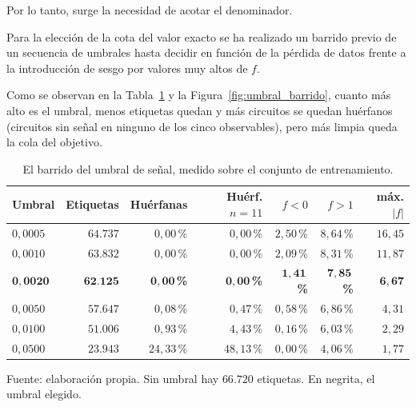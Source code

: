 Por lo tanto, surge la necesidad de acotar el denominador.

Para la elección de la cota del valor exacto se ha realizado un barrido previo de un secuencia de umbrales hasta decidir en función de la pérdida de datos frente a la introducción de sesgo por valores muy altos de $f$.

Como se observan en la Tabla~\ref{tab:barrido} y la Figura~\ref{fig:umbral_barrido}, cuanto más alto es el umbral, menos etiquetas quedan y más circuitos se quedan huérfanos (circuitos sin señal en ninguno de los cinco observables), pero más limpia queda la cola del objetivo.

\begin{table}[htbp]
    \centering
    \caption{El barrido del umbral de señal, medido sobre el conjunto de entrenamiento.}
    \label{tab:barrido}
    {\footnotesize
    \begin{tabular}{@{}lrrrrrr@{}}
        \toprule
        \textbf{Umbral} & \textbf{Etiquetas} & \textbf{Huérfanas}
            & \textbf{Huérf. $n{=}11$} & \textbf{$f<0$} & \textbf{$f>1$}
            & \textbf{máx. $|f|$} \\
        \midrule
        $0{,}0005$ & $64{.}737$ & $0{,}00$\,\% & $0{,}00$\,\% & $2{,}50$\,\% & $8{,}64$\,\% & $16{,}45$ \\
        $0{,}0010$ & $63{.}832$ & $0{,}00$\,\% & $0{,}00$\,\% & $2{,}09$\,\% & $8{,}31$\,\% & $11{,}87$ \\
        $\bm{0{,}0020}$ & $\bm{62{.}125}$ & $\bm{0{,}00}$\textbf{\,\%} & $\bm{0{,}00}$\textbf{\,\%}
                        & $\bm{1{,}41}$\textbf{\,\%} & $\bm{7{,}85}$\textbf{\,\%} & $\bm{6{,}67}$ \\
        $0{,}0050$ & $57{.}647$ & $0{,}08$\,\% & $0{,}47$\,\% & $0{,}58$\,\% & $6{,}86$\,\% & $4{,}31$ \\
        $0{,}0100$ & $51{.}006$ & $0{,}93$\,\% & $4{,}43$\,\% & $0{,}16$\,\% & $6{,}03$\,\% & $2{,}29$ \\
        $0{,}0500$ & $23{.}943$ & $24{,}33$\,\% & $48{,}13$\,\% & $0{,}00$\,\% & $4{,}06$\,\% & $1{,}77$ \\
        \bottomrule
    \end{tabular}}

    {\footnotesize Fuente: elaboración propia. Sin umbral hay $66{.}720$ etiquetas. En negrita,
    el umbral elegido.}
\end{table}

